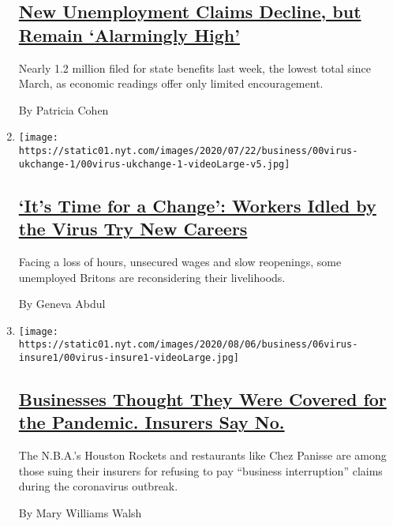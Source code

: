 \begin{enumerate}
  \hypertarget{new-unemployment-claims-decline-but-remain-alarmingly-high}{%
  \subsection{\texorpdfstring{\href{/2020/08/06/business/economy/unemployment-claims.html}{New
  Unemployment Claims Decline, but Remain `Alarmingly
  High'}}{New Unemployment Claims Decline, but Remain `Alarmingly High'}}\label{new-unemployment-claims-decline-but-remain-alarmingly-high}}

  Nearly 1.2 million filed for state benefits last week, the lowest
  total since March, as economic readings offer only limited
  encouragement.

  By Patricia Cohen
\item
  \texttt{[image: https://static01.nyt.com/images/2020/07/22/business/00virus-ukchange-1/00virus-ukchange-1-videoLarge-v5.jpg]}

  \hypertarget{its-time-for-a-change-workers-idled-by-the-virus-try-new-careers}{%
  \subsection{\texorpdfstring{\href{/2020/08/06/business/british-workers-careers-pandemic.html}{`It's
  Time for a Change': Workers Idled by the Virus Try New
  Careers}}{`It's Time for a Change': Workers Idled by the Virus Try New Careers}}\label{its-time-for-a-change-workers-idled-by-the-virus-try-new-careers}}

  Facing a loss of hours, unsecured wages and slow reopenings, some
  unemployed Britons are reconsidering their livelihoods.

  By Geneva Abdul
\item
  \texttt{[image: https://static01.nyt.com/images/2020/08/06/business/06virus-insure1/00virus-insure1-videoLarge.jpg]}

  \hypertarget{businesses-thought-they-were-covered-for-the-pandemic-insurers-say-no}{%
  \subsection{\texorpdfstring{\href{/2020/08/05/business/business-interruption-insurance-pandemic.html}{Businesses
  Thought They Were Covered for the Pandemic. Insurers Say
  No.}}{Businesses Thought They Were Covered for the Pandemic. Insurers Say No.}}\label{businesses-thought-they-were-covered-for-the-pandemic-insurers-say-no}}

  The N.B.A.'s Houston Rockets and restaurants like Chez Panisse are
  among those suing their insurers for refusing to pay ``business
  interruption'' claims during the coronavirus outbreak.

  By Mary Williams Walsh
\end{enumerate}

